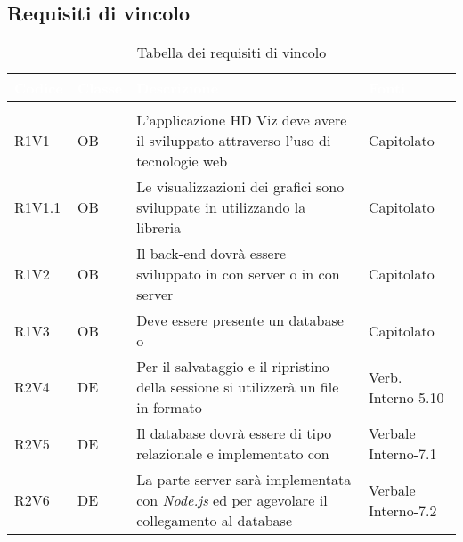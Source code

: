 \subsection{Requisiti di vincolo}
{
\setlength\arrayrulewidth{1pt}
\begin{longtable}{C{2cm} | C{1.5cm} | C{9cm} | C{3.3cm}}
		\textcolor{white}{\textbf{Codice}} & 
		\textcolor{white}{\textbf{Classe}} & 
		\textcolor{white}{\textbf{Descrizione}} & 
		\textcolor{white}{\textbf{Fonti}} \\
		\endfirsthead
	    \\
	    \endfoot
	    \caption{Tabella dei requisiti di vincolo}
	    \endlastfoot

R1V1 & OB & L'applicazione HD Viz deve avere il  sviluppato attraverso l'uso di tecnologie web & Capitolato \\
R1V1.1 & OB & Le visualizzazioni dei grafici sono sviluppate in  utilizzando la libreria  & Capitolato\\
R1V2 & OB & Il back-end dovrà essere sviluppato in  con server  o in  con server  & Capitolato \\
R1V3 & OB & Deve essere presente un database  o  & Capitolato\\
R2V4 & DE & Per il salvataggio e il ripristino della sessione si utilizzerà un file in formato  & Verb. Interno-5.10\\
R2V5 & DE & Il database dovrà essere di tipo relazionale e implementato con \textit{} & Verbale Interno-7.1\\
R2V6 & DE & La parte server sarà implementata con \textit{Node.js} ed \textit{} per agevolare il collegamento al database & Verbale Interno-7.2 \\


\end{longtable}}
